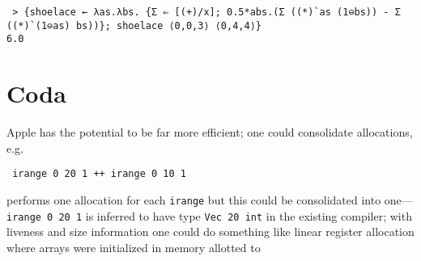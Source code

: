 \documentclass[sigplan,screen]{acmart}
\begin{document}
\begin{verbatim}
 > {shoelace ← λas.λbs. {Σ ⇐ [(+)/x]; 0.5*abs.(Σ ((*)`as (1⊖bs)) - Σ ((*)`(1⊖as) bs))}; shoelace ⟨0,0,3⟩ ⟨0,4,4⟩}
6.0
\end{verbatim}

\section{Coda}

Apple has the potential to be far more efficient; one could consolidate allocations, e.g.

\begin{verbatim}
 irange 0 20 1 ++ irange 0 10 1
\end{verbatim}

performs one allocation for each {\tt irange} but this could be consolidated into one---{\tt irange 0 20 1} is inferred to have type {\tt Vec 20 int} in the existing compiler; with liveness and size information one could do something like linear register allocation where arrays were initialized in memory allotted to
\end{document}
